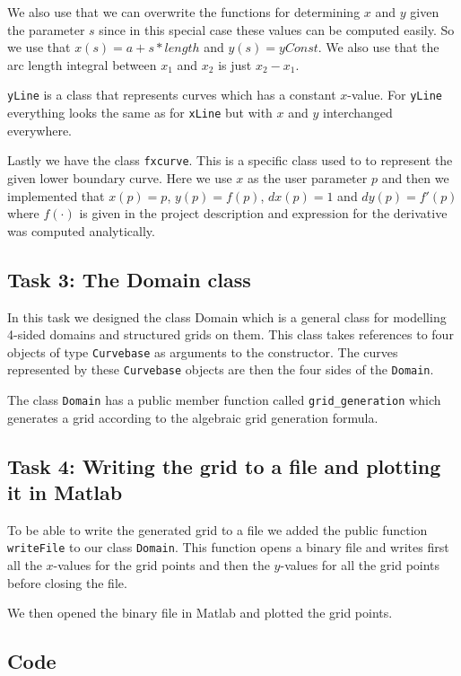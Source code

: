 \documentclass[a4paper,10pt]{article}
\begin{document}
We also use that we can overwrite the functions for determining $x$ and $y$ given the parameter $s$ since in this special case these values can be computed easily. So we use that $x(s) = a+s*length$ and $y(s) = yConst$. We also use that the arc length integral between $x_1$ and $x_2$ is just $x_2-x_1$.

\texttt{yLine} is a class that represents curves which has a constant $x$-value. For \texttt{yLine} everything looks the same as for \texttt{xLine} but with $x$ and $y$ interchanged everywhere.

Lastly we have the class \texttt{fxcurve}. This is a specific class used to to represent the given lower boundary curve. Here we use $x$ as the user parameter $p$ and then we implemented that $x(p) = p$, $y(p) = f(p)$, $dx(p) = 1$ and $dy(p) = f'(p)$ where $f(\cdot)$ is given in the project description and expression for the derivative was computed analytically.  
 

\subsection*{Task 3: The Domain class}
In this task we designed the class Domain which is a general class for modelling 4-sided domains and structured grids on them. This class takes references to four objects of type \texttt{Curvebase} as arguments to the constructor. The curves represented by these \texttt{Curvebase} objects are then the four sides of the \texttt{Domain}. 


The class \texttt{Domain} has a public member function called \texttt{grid\_generation} which generates a grid according to the algebraic grid generation formula.

\subsection*{Task 4: Writing the grid to a file and plotting it in Matlab}
To be able to write the generated grid to a file we added the public function \texttt{writeFile} to our class \texttt{Domain}. This function opens a binary file and writes first all the $x$-values for the grid points and then the $y$-values for all the grid points before closing the file. 

We then opened the binary file in Matlab and plotted the grid points. 


\newpage
\subsection*{Code}
\end{document}
